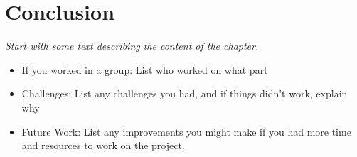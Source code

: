 \section{Conclusion}
\emph{Start with some text describing the content of the chapter.}\\

\begin{itemize}
    \item If you worked in a group: List who worked on what part
    \item Challenges: List any challenges you had, and if things didn’t work, explain why
    \item Future  Work: List any improvements you might make if you had more time and resources to work on the project.
    
\end{itemize}
